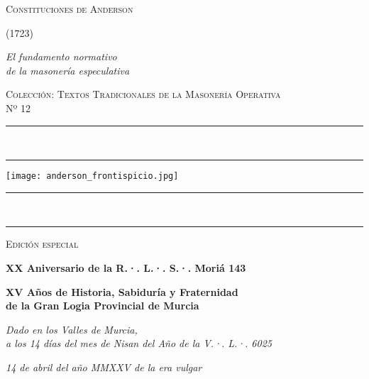 \documentclass[a4paper,12pt,twoside]{book}
\newcommand{\ornline}{%
\begin{center}
\textcolor{dorado}{{\LARGE\rule{0.2\textwidth}{0.4pt}}~\scalebox{1.2}{❧}~\scalebox{1.2}{❧}~\scalebox{1.2}{❧}~
{\LARGE\rule{0.2\textwidth}{0.4pt}}}
\end{center}}
\begin{document}
\frontmatter

\begin{titlepage}
\begin{center}

\vspace*{1.5cm}

{\Huge\scshape\textcolor{borgoña}{Constituciones de Anderson}}

\vspace{1cm}

{\Large\scshape\textcolor{borgoña}{(1723)}}

\vspace{1cm}

{\Large\itshape El fundamento normativo\\de la masonería especulativa}

\vspace{1cm}

{\large\scshape Colección: Textos Tradicionales de la Masonería Operativa\\Nº 12}

\vspace{1cm}

\ornline

\vspace{0.5cm}

\texttt{[image: anderson\_frontispicio.jpg]}

\vspace{0.5cm}

\ornline

\vspace{1.5cm}
\newpage
{\large\scshape Edición especial}

\vspace{0.5cm}

{\Large\bfseries XX Aniversario de la R.·. L.·. S.·. Moriá 143}

\vspace{1cm}

{\Large\bfseries XV Años de Historia, Sabiduría y Fraternidad\\de la Gran Logia Provincial de Murcia}

\vspace{1cm}

{\normalsize\itshape Dado en los Valles de Murcia,\\a los 14 días del mes de Nisan del Año de la V.·. L.·. 6025}

\vspace{0.5cm}

{\normalsize\itshape 14 de abril del año MMXXV de la era vulgar}

\end{center}
\end{titlepage}
\end{document}
